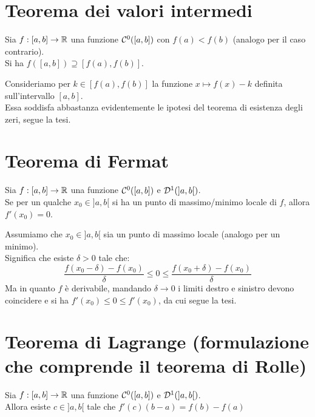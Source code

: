 \documentclass[openany]{book}
\begin{document}
\section{Teorema dei valori intermedi}

\begin{theorem}{}{}
    Sia $f : [a,b] \to \mathbb{R}$ una funzione $\mathcal{C}^0([a,b])$ con $f(a) < f(b)$ (analogo per il caso contrario).\\
    Si ha $f([a,b]) \supseteq [f(a), f(b)]$.
\end{theorem}

    Consideriamo per $k \in [f(a), f(b)]$ la funzione $x \mapsto f(x)-k$ definita sull'intervallo $[a,b]$.\\
    Essa soddisfa abbastanza evidentemente le ipotesi del teorema di esistenza degli zeri, segue la tesi.


\section{Teorema di Fermat}

\begin{theorem}{}{}
    Sia $f : [a,b] \to \mathbb{R}$ una funzione $\mathcal{C}^0([a,b])$ e $\mathcal{D}^1(]a,b[)$.\\
    Se per un qualche $x_0 \in ]a,b[$ si ha un punto di massimo/minimo locale di $f$, allora $f'(x_0)=0$.
\end{theorem}

    Assumiamo che $x_0 \in ]a,b[$ sia un punto di massimo locale (analogo per un minimo).\\
    Significa che esiste $\delta>0$ tale che:
    \[\frac{f(x_0 - \delta) - f(x_0)}{\delta} \le 0 \le \frac{f(x_0 + \delta) - f(x_0)}{\delta}\]
    Ma in quanto $f$ è derivabile, mandando $\delta\to 0$ i limiti destro e sinistro devono coincidere e si ha $f'(x_0)\le 0\le f'(x_0)$, da cui segue la tesi. 


\section{Teorema di Lagrange (formulazione che comprende il teorema di Rolle)}

\begin{theorem}{}{}
    Sia $f : [a,b] \to \mathbb{R}$ una funzione $\mathcal{C}^0([a,b])$ e $\mathcal{D}^1(]a,b[)$.\\
    Allora esiste  $c \in ]a,b[$ tale che $f'(c)(b-a) = f(b)-f(a)$
\end{theorem}
\end{document}
